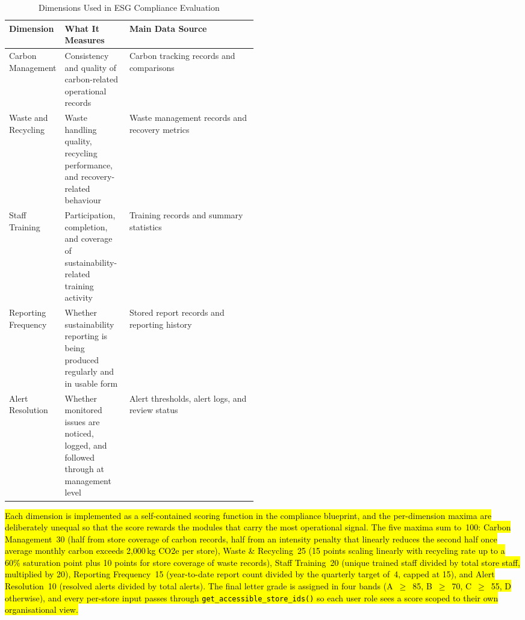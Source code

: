 \documentclass[11pt,a4paper]{article}
\newcommand{\new}[1]{\hl{#1}}
\begin{document}
\begin{table}[h]
\centering
\scriptsize
\begin{tabularx}{\linewidth}{@{}p{0.22\linewidth}p{0.26\linewidth}X@{}}
\toprule
\textbf{Dimension} & \textbf{What It Measures} & \textbf{Main Data Source} \\
\midrule
Carbon Management & Consistency and quality of carbon-related operational records & Carbon tracking records and comparisons \\
Waste and Recycling & Waste handling quality, recycling performance, and recovery-related behaviour & Waste management records and recovery metrics \\
Staff Training & Participation, completion, and coverage of sustainability-related training activity & Training records and summary statistics \\
Reporting Frequency & Whether sustainability reporting is being produced regularly and in usable form & Stored report records and reporting history \\
Alert Resolution & Whether monitored issues are noticed, logged, and followed through at management level & Alert thresholds, alert logs, and review status \\
\bottomrule
\end{tabularx}
\caption{Dimensions Used in ESG Compliance Evaluation}
\end{table}

\new{Each dimension is implemented as a self-contained scoring function in the compliance blueprint, and the per-dimension maxima are deliberately unequal so that the score rewards the modules that carry the most operational signal. The five maxima sum to~100: Carbon Management~30 (half from store coverage of carbon records, half from an intensity penalty that linearly reduces the second half once average monthly carbon exceeds 2{,}000\,kg CO2e per store), Waste \& Recycling~25 (15 points scaling linearly with recycling rate up to a 60\% saturation point plus 10 points for store coverage of waste records), Staff Training~20 (unique trained staff divided by total store staff, multiplied by 20), Reporting Frequency~15 (year-to-date report count divided by the quarterly target of~4, capped at 15), and Alert Resolution~10 (resolved alerts divided by total alerts). The final letter grade is assigned in four bands (A~$\geq$~85, B~$\geq$~70, C~$\geq$~55, D otherwise), and every per-store input passes through \texttt{get\_accessible\_store\_ids()} so each user role sees a score scoped to their own organisational view.}
\end{document}
